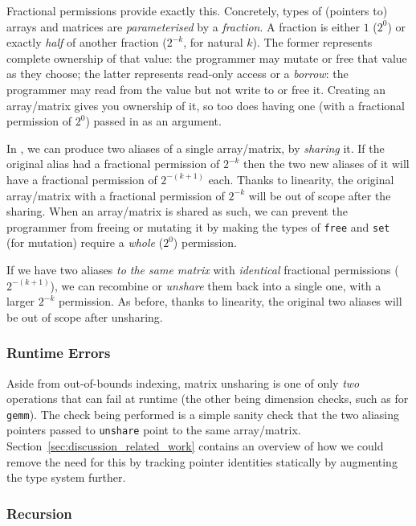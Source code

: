 Fractional permissions provide exactly this. Concretely, types of (pointers to)
arrays and matrices are \emph{parameterised} by a \emph{fraction}. A fraction
is either $1$ ($2^0$) or exactly \emph{half} of another fraction ($2^{-k}$, for
natural $k$). The former represents complete ownership of that value: the
programmer may mutate or free that value as they choose; the latter represents
read-only access or a \emph{borrow}: the programmer may read from the value but
not write to or free it. Creating an array/matrix gives you ownership of it, so
too does having one (with a fractional permission of $2^0$) passed in as an
argument.

In \lang, we can produce two aliases of a single array/matrix, by
\emph{sharing} it. If the original alias had a fractional permission of
$2^{-k}$ then the two new aliases of it will have a fractional permission of
$2^{-(k+1)}$ each. Thanks to linearity, the original array/matrix with a
fractional permission of $2^{-k}$ will be out of scope after the sharing.  When
an array/matrix is shared as such, we can prevent the programmer from freeing
or mutating it by making the types of \texttt{free} and \texttt{set} (for
mutation) require a \emph{whole} ($2^0$) permission.

If we have two aliases \emph{to the same matrix} with \emph{identical}
fractional permissions ($2^{-(k+1)}$), we can recombine or \emph{unshare} them
back into a single one, with a larger $2^{-k}$ permission. As before, thanks to
linearity, the original two aliases will be out of scope after unsharing.

\subsubsection{Runtime Errors}

Aside from out-of-bounds indexing, matrix unsharing is one of only \emph{two}
operations that can fail at runtime (the other being dimension checks, such as
for \texttt{gemm}). The check being performed is a simple sanity check that the
two aliasing pointers passed to \texttt{unshare} point to the same array/matrix.
Section~\ref{sec:discussion_related_work} contains an overview of how we could
remove the need for this by tracking pointer identities statically by
augmenting the type system further.

\subsubsection{Recursion}

